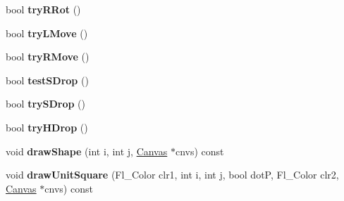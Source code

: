 \begin{DoxyCompactItemize}
\item 
\hypertarget{class_tetris_1_1_board_a6cac2a0561c0dbe332559e372bd65990}{bool {\bfseries try\-R\-Rot} ()}\label{class_tetris_1_1_board_a6cac2a0561c0dbe332559e372bd65990}

\item 
\hypertarget{class_tetris_1_1_board_a8b0e27172ecd733b30c57d2b8d62a79e}{bool {\bfseries try\-L\-Move} ()}\label{class_tetris_1_1_board_a8b0e27172ecd733b30c57d2b8d62a79e}

\item 
\hypertarget{class_tetris_1_1_board_a8308cf4cad8969c27f660a93e6ebccc5}{bool {\bfseries try\-R\-Move} ()}\label{class_tetris_1_1_board_a8308cf4cad8969c27f660a93e6ebccc5}

\item 
\hypertarget{class_tetris_1_1_board_a48a776d34586af48fa49f337d9028567}{bool {\bfseries test\-S\-Drop} ()}\label{class_tetris_1_1_board_a48a776d34586af48fa49f337d9028567}

\item 
\hypertarget{class_tetris_1_1_board_a7f3ea2560b28333dc9193f346069532c}{bool {\bfseries try\-S\-Drop} ()}\label{class_tetris_1_1_board_a7f3ea2560b28333dc9193f346069532c}

\item 
\hypertarget{class_tetris_1_1_board_ab58e0d33d099c01a9445ce7e72de9d6e}{bool {\bfseries try\-H\-Drop} ()}\label{class_tetris_1_1_board_ab58e0d33d099c01a9445ce7e72de9d6e}

\item 
\hypertarget{class_tetris_1_1_board_adf8407d0a75188dc8c520555803bc92e}{void {\bfseries draw\-Shape} (int i, int j, \hyperlink{class_k_graph_1_1_canvas}{Canvas} $\ast$cnvs) const }\label{class_tetris_1_1_board_adf8407d0a75188dc8c520555803bc92e}

\item 
\hypertarget{class_tetris_1_1_board_a2a314e0a0277a3990a70faa15e8ef7ce}{void {\bfseries draw\-Unit\-Square} (Fl\-\_\-\-Color clr1, int i, int j, bool dot\-P, Fl\-\_\-\-Color clr2, \hyperlink{class_k_graph_1_1_canvas}{Canvas} $\ast$cnvs) const }\label{class_tetris_1_1_board_a2a314e0a0277a3990a70faa15e8ef7ce}

\end{DoxyCompactItemize}
